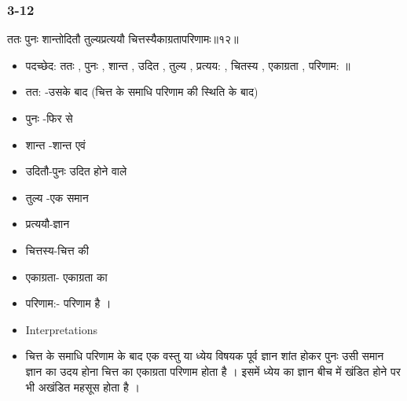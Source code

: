 \begin{frame}[fragile]\frametitle{3-12}
\begin{sanskrit}
ततः पुनः शान्तोदितौ तुल्यप्रत्ययौ चित्तस्यैकाग्रतापरिणामः॥१२॥
\end{sanskrit}

	\begin{itemize}
	\item पदच्छेद: ततः , पुनः , शान्त , उदित , तुल्य , प्रत्यय: , चितस्य , एकाग्रता , परिणाम: ॥
	\item तत: -उसके बाद (चित्त के समाधि परिणाम की स्थिति के बाद)
	\item पुनः -फिर से
	\item शान्त -शान्त एवं
	\item उदितौ-पुनः उदित होने वाले
	\item तुल्य -एक समान
	\item प्रत्ययौ-ज्ञान
	\item चित्तस्य-चित्त की
	\item एकाग्रता- एकाग्रता का
	\item परिणाम:- परिणाम है ।	
	\item Interpretations
	\item चित्त के समाधि परिणाम के बाद एक वस्तु या ध्येय विषयक पूर्व ज्ञान शांत होकर पुनः उसी समान ज्ञान का उदय होना चित्त का एकाग्रता परिणाम होता है । इसमें ध्येय का ज्ञान बीच में खंडित होने पर भी अखंडित महसूस होता है ।
	\end{itemize}
\end{frame}

